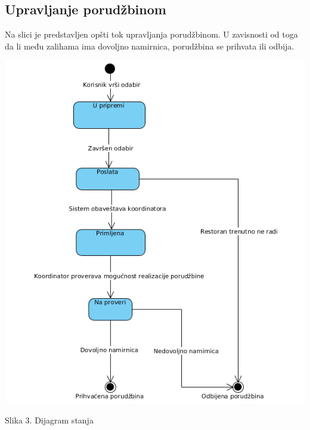 \subsection{Upravljanje porudžbinom}
Na slici je predstavljen opšti tok upravljanja porudžbinom. U zavisnosti od toga da li među zalihama ima dovoljno namirnica, porudžbina se prihvata ili odbija.

\includegraphics[width=136mm]{slike/Upravljanje_porudzbinom.png}\\
\begin{center}
\caption{Slika 3. Dijagram stanja}\\
\end{center}

 
 

